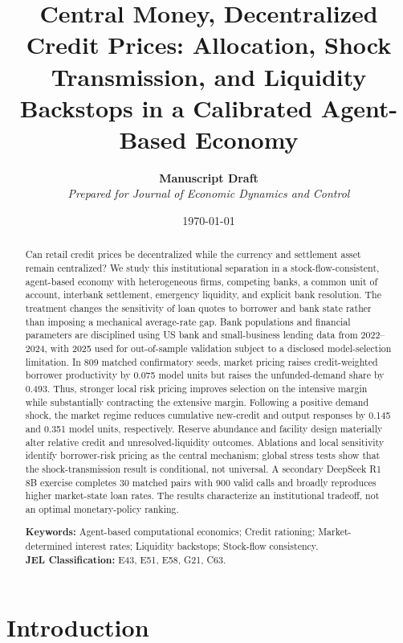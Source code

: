 \documentclass[11pt,a4paper]{article}
\title{\textbf{Central Money, Decentralized Credit Prices: Allocation, Shock Transmission, and Liquidity Backstops in a Calibrated Agent-Based Economy}}
\author{
    \textbf{Manuscript Draft} \\
    \textit{Prepared for Journal of Economic Dynamics and Control}
}
\date{\today}
\begin{document}
\maketitle

\begin{abstract}
Can retail credit prices be decentralized while the currency and settlement asset remain centralized? We study this institutional separation in a stock-flow-consistent, agent-based economy with heterogeneous firms, competing banks, a common unit of account, interbank settlement, emergency liquidity, and explicit bank resolution. The treatment changes the sensitivity of loan quotes to borrower and bank state rather than imposing a mechanical average-rate gap. Bank populations and financial parameters are disciplined using US bank and small-business lending data from 2022--2024, with 2025 used for out-of-sample validation subject to a disclosed model-selection limitation. In 809 matched confirmatory seeds, market pricing raises credit-weighted borrower productivity by 0.075 model units but raises the unfunded-demand share by 0.493. Thus, stronger local risk pricing improves selection on the intensive margin while substantially contracting the extensive margin. Following a positive demand shock, the market regime reduces cumulative new-credit and output responses by 0.145 and 0.351 model units, respectively. Reserve abundance and facility design materially alter relative credit and unresolved-liquidity outcomes. Ablations and local sensitivity identify borrower-risk pricing as the central mechanism; global stress tests show that the shock-transmission result is conditional, not universal. A secondary DeepSeek R1 8B exercise completes 30 matched pairs with 900 valid calls and broadly reproduces higher market-state loan rates. The results characterize an institutional tradeoff, not an optimal monetary-policy ranking.
\vspace{0.8em}

\noindent \textbf{Keywords:} Agent-based computational economics; Credit rationing; Market-determined interest rates; Liquidity backstops; Stock-flow consistency. \\
\textbf{JEL Classification:} E43, E51, E58, G21, C63.
\end{abstract}

\onehalfspacing

\section{Introduction}
\end{document}
